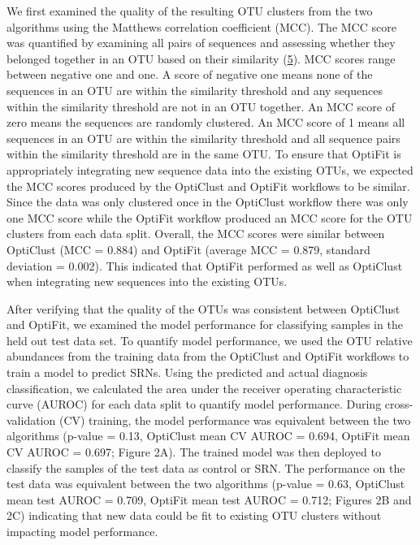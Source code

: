 \documentclass[
]{article}
\begin{document}
We first examined the quality of the resulting OTU clusters from the two
algorithms using the Matthews correlation coefficient (MCC). The MCC
score was quantified by examining all pairs of sequences and assessing
whether they belonged together in an OTU based on their similarity
(\protect\hyperlink{ref-westcott2017}{5}). MCC scores range between
negative one and one. A score of negative one means none of the
sequences in an OTU are within the similarity threshold and any
sequences within the similarity threshold are not in an OTU together. An
MCC score of zero means the sequences are randomly clustered. An MCC
score of 1 means all sequences in an OTU are within the similarity
threshold and all sequence pairs within the similarity threshold are in
the same OTU. To ensure that OptiFit is appropriately integrating new
sequence data into the existing OTUs, we expected the MCC scores
produced by the OptiClust and OptiFit workflows to be similar. Since the
data was only clustered once in the OptiClust workflow there was only
one MCC score while the OptiFit workflow produced an MCC score for the
OTU clusters from each data split. Overall, the MCC scores were similar
between OptiClust (MCC = 0.884) and OptiFit (average MCC = 0.879,
standard deviation = 0.002). This indicated that OptiFit performed as
well as OptiClust when integrating new sequences into the existing OTUs.

After verifying that the quality of the OTUs was consistent between
OptiClust and OptiFit, we examined the model performance for classifying
samples in the held out test data set. To quantify model performance, we
used the OTU relative abundances from the training data from the
OptiClust and OptiFit workflows to train a model to predict SRNs. Using
the predicted and actual diagnosis classification, we calculated the
area under the receiver operating characteristic curve (AUROC) for each
data split to quantify model performance. During cross-validation (CV)
training, the model performance was equivalent between the two
algorithms (p-value = 0.13, OptiClust mean CV AUROC = 0.694, OptiFit
mean CV AUROC = 0.697; Figure 2A). The trained model was then deployed
to classify the samples of the test data as control or SRN. The
performance on the test data was equivalent between the two algorithms
(p-value = 0.63, OptiClust mean test AUROC = 0.709, OptiFit mean test
AUROC = 0.712; Figures 2B and 2C) indicating that new data could be fit
to existing OTU clusters without impacting model performance.
\end{document}
